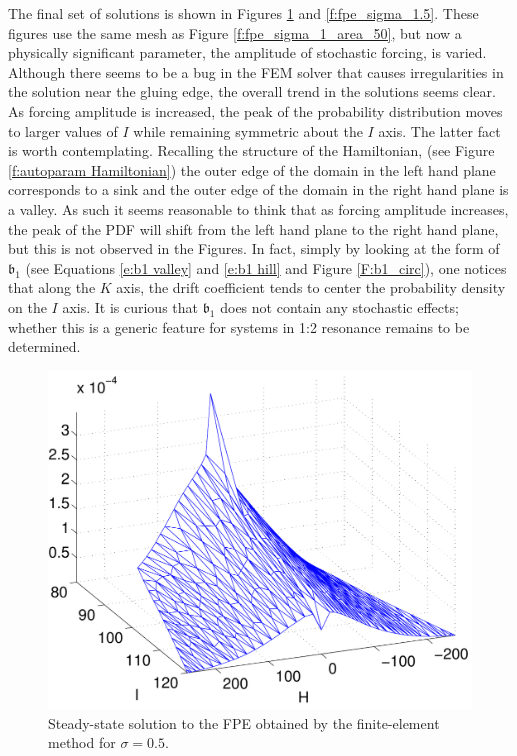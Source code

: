 The final set of solutions is shown in Figures \ref{f:fpe_sigma_.5} and \ref{f:fpe_sigma_1.5}. These figures use the same mesh as Figure \ref{f:fpe_sigma_1_area_50}, but now a physically significant parameter, the amplitude of stochastic forcing, is varied. Although there seems to be a bug in the FEM solver that causes irregularities in the solution near the gluing edge, the overall trend in the solutions seems clear. As forcing amplitude is increased, the peak of the probability distribution moves to larger values of $I$ while remaining symmetric about the $I$ axis. The latter fact is worth contemplating. Recalling the structure of the Hamiltonian, (see Figure \ref{f:autoparam Hamiltonian}) the outer edge of the domain in the left hand plane corresponds to a sink and the outer edge of the domain in the right hand plane is a valley. As such it seems reasonable to think that as forcing amplitude increases, the peak of the PDF will shift from the left hand plane to the right hand plane, but this is not observed in the Figures. In fact, simply by looking at the form of $\mathfrak b_1$ (see Equations \eqref{e:b1 valley} and \eqref{e:b1 hill} and Figure \ref{F:b1_circ}), one notices that along the $K$ axis, the drift coefficient tends to center the probability density on the $I$ axis. It is curious that $\mathfrak b_1$ does not contain any stochastic effects; whether this is a generic feature for systems in 1:2 resonance remains to be determined.

\begin{figure}
\begin{center}
\includegraphics[width=\textwidth]{figures/fpe_solution_sigma_p5}
\caption{Steady-state solution to the FPE obtained by the finite-element method for $\sigma = 0.5$.}
\label{f:fpe_sigma_.5}
\end{center}
\end{figure}

